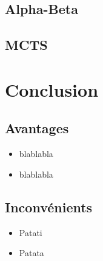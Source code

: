 \documentclass{article}
\begin{document}
\subsection{Alpha-Beta}

\subsection{MCTS}


\section{Conclusion} 
\subsection{Avantages} 

\begin{itemize}
   \item blablabla
   \item blablabla
\end{itemize}


\subsection{Inconvénients} 
\begin{itemize}
   \item Patati
   \item Patata
\end{itemize}
\end{document}
